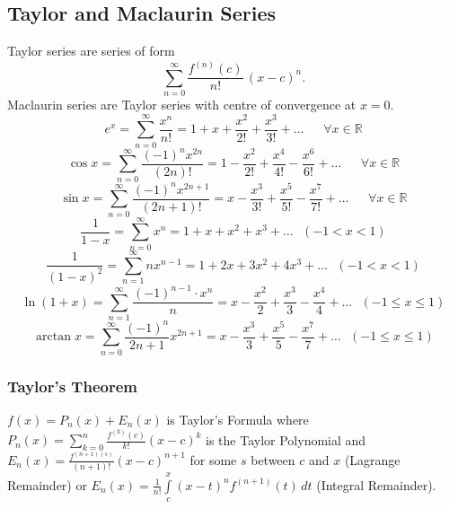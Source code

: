 \documentclass[12pt]{article}
\begin{document}
\subsection{Taylor and Maclaurin Series}
Taylor series are series of form $$\sum \limits_{n=0}^\infty \frac{f^{(n)}(c)}{n!}\,(x-c)^n.$$
Maclaurin series are Taylor series with centre of convergence at $x=0$.
$${{e^x} = \sum\limits_{n = 0}^\infty  {\frac{{{x^n}}}{{n!}}}  }={ 1 + x + {\frac{{{x^2}}}{{2!}}} }+{ {\frac{{{x^3}}}{{3!}}} +  \ldots} \ \ \ \ \ \ \ \forall x\in \mathbb{R}$$
$${\cos x = \sum \limits_{n = 0}^\infty  {\frac{{{{\left( { - 1} \right)}^n}{x^{2n}}}}{{\left( {2n} \right)!}}} }={ 1 - {\frac{{{x^2}}}{{2!}}} }+{ {\frac{{{x^4}}}{{4!}}} }-{ {\frac{{{x^6}}}{{6!}}} +  \ldots } \ \ \ \ \ \ \ \forall x\in \mathbb{R}$$
$${\sin x = \sum\limits_{n = 0}^\infty  {\frac{{{{\left( { - 1} \right)}^n}{x^{2n + 1}}}}{{\left( {2n + 1} \right)!}}}  }={ x - {\frac{{{x^3}}}{{3!}}} }+{ {\frac{{{x^5}}}{{5!}}} }-{ {\frac{{{x^7}}}{{7!}}} +  \ldots} \ \ \ \ \ \ \ \forall x\in \mathbb{R}$$
$$\frac{1}{1-x}=\sum \limits_{n=0}^\infty x^n=1+x+x^2+x^3+\ldots \ \ \ (-1< x < 1)$$
$$\frac{1}{(1-x)^2} = \sum \limits_{n=1}^\infty nx^{n-1} = 1+2x+3x^2+4x^3+\ldots \ \ \ (-1< x < 1)$$
$$\ln (1+x) = \sum \limits_{n=1}^\infty \frac{(-1)^{n-1}\cdot x^n}{n}=x-\frac{x^2}{2}+\frac{x^3}{3}-\frac{x^4}{4} + \ldots \ \ \ (-1\leq x \leq 1)$$
$$\arctan x=\sum \limits_{n=0}^\infty \frac{(-1)^n}{2n+1}x^{2n+1} = x -\frac{x^3}{3}+\frac{x^5}{5}-\frac{x^7}{7}+\ldots \ \ \ (-1\leq x \leq 1)$$
\subsubsection{Taylor's Theorem}
$f(x)=P_n(x)+E_n(x)$ is Taylor's Formula where $P_n(x)=\sum \limits_{k=0}^n \frac{f^{(k)}(c)}{k!} (x-c)^k$ is the Taylor Polynomial and $E_n(x)=\frac{f^{(n+1)(s)}}{(n+1)!}(x-c)^{n+1}$ for some $s$ between $c$ and $x$ (Lagrange Remainder) or $E_n(x)=\frac{1}{n!} \int \limits_c^x (x-t)^n f^{(n+1)}(t)\,dt$ (Integral Remainder).
\end{document}
